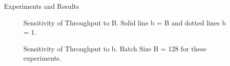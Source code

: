 \documentclass[final]{beamer}
\newlength{\twocolwid}
\begin{document}
\begin{frame}
\begin{columns}[t]
\begin{column}{\twocolwid}
\begin{columns}[t,totalwidth=\twocolwid]
\begin{column}{\twocolwid}
\begin{exampleblock}{Experiments and Results}
\begin{multicols}{3}
\begin{figure}
\caption{Sensitivity of Throughput to B. Solid line b = B and dotted lines b = 1.}
\end{figure}

\begin{figure}
\caption{Sensitivity of Throughput to b. Batch Size B = 128 for these experiments.}
\end{figure}


\end{multicols}
\end{exampleblock}
\end{column}
\end{columns}
\end{column}
\end{columns}
\end{frame}
\end{document}
